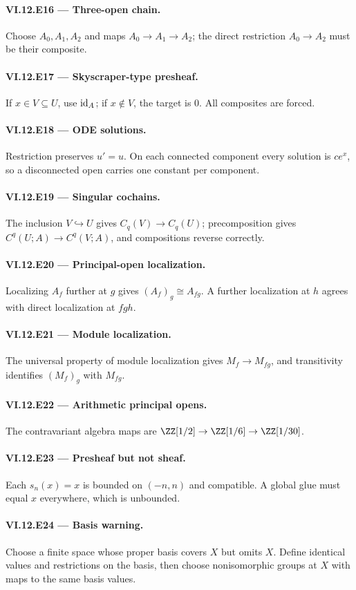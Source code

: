 \paragraph{VI.12.E16 --- Three-open chain.}
Choose $A_0,A_1,A_2$ and maps $A_0\to A_1\to A_2$; the direct restriction $A_0\to A_2$ must be their composite.

\paragraph{VI.12.E17 --- Skyscraper-type presheaf.}
If $x\in V\subseteq U$, use $\operatorname{id}_A$; if $x\notin V$, the target is $0$.  All composites are forced.

\paragraph{VI.12.E18 --- ODE solutions.}
Restriction preserves $u'=u$.  On each connected component every solution is $ce^x$, so a disconnected open carries one constant per component.

\paragraph{VI.12.E19 --- Singular cochains.}
The inclusion $V\hookrightarrow U$ gives $C_q(V)\to C_q(U)$; precomposition gives $C^q(U;A)\to C^q(V;A)$, and compositions reverse correctly.

\paragraph{VI.12.E20 --- Principal-open localization.}
Localizing $A_f$ further at $g$ gives $(A_f)_g\cong A_{fg}$.  A further localization at $h$ agrees with direct localization at $fgh$.

\paragraph{VI.12.E21 --- Module localization.}
The universal property of module localization gives $M_f\to M_{fg}$, and transitivity identifies $(M_f)_g$ with $M_{fg}$.

\paragraph{VI.12.E22 --- Arithmetic principal opens.}
The contravariant algebra maps are $\ZZ[1/2]\to\ZZ[1/6]\to\ZZ[1/30]$.

\paragraph{VI.12.E23 --- Presheaf but not sheaf.}
Each $s_n(x)=x$ is bounded on $(-n,n)$ and compatible.  A global glue must equal $x$ everywhere, which is unbounded.

\paragraph{VI.12.E24 --- Basis warning.}
Choose a finite space whose proper basis covers $X$ but omits $X$.  Define identical values and restrictions on the basis, then choose nonisomorphic groups at $X$ with maps to the same basis values.
